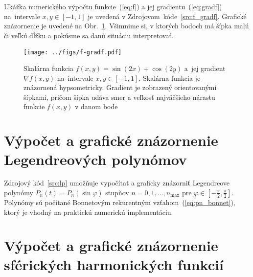 \documentclass[a4paper, 12pt]{book}
\begin{document}
Ukážka numerického výpočtu funkcie~(\ref{eq:f}) a jej 
gradientu~(\ref{eq:gradf}) na~intervale $x, y \in [-1, 1]$ je uvedená 
v Zdrojovom~kóde~\ref{src:f_gradf}.  Grafické znázornenie je uvedené na 
Obr.~\ref{fig:f_gradf}.  Všimnime si, v ktorých bodoch má šípka malú či veľkú 
dĺžku a pokúsme sa danú situáciu interpretovať.



\begin{figure}[bt]
\centering
\texttt{[image: ../figs/f-gradf.pdf]}
\caption{Skalárna funkcia $f(x, y) = \sin(2x) + \cos(2y)$ a~jej gradient 
$\nabla f(x, y)$ na~intervale $x, y \in [-1, 1]$.  Skalárna funkcia je 
znázornená hypsometricky.  Gradient je zobrazený orientovanými šípkami, pričom 
šípka udáva smer a veľkosť najväčšieho nárastu funkcie $f(x, y)$ v danom bode}
\label{fig:f_gradf}
\end{figure}




\chapter{Výpočet a grafické znázornenie Legendreových polynómov}
\label{app:lp}

Zdrojový kód~\ref{src:lp} umožňuje vypočítať a graficky znázorniť Legendreove 
polynómy $P_n(t) = P_n(\sin\varphi)$ stupňov $n = 0, 1, \dots, n_{\max}$ pre 
$\varphi \in [-\frac{\pi}{2}, \frac{\pi}{2}]$.  Polynómy sú počítané Bonnetovým 
rekurentným vzťahom~(\ref{eq:pn_bonnet}), ktorý je vhodný na praktickú 
numerickú implementáciu.







\chapter{Výpočet a grafické znázornenie sférických harmonických funkcií}
\label{app:sh}







\end{document}
